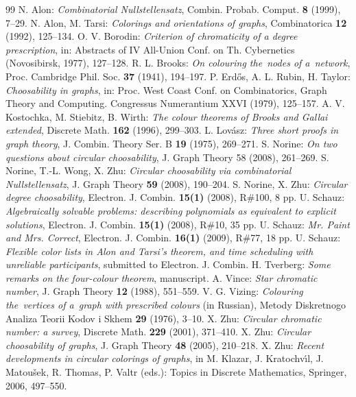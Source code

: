 \documentclass[10pt]{article}
\begin{document}
\begin{thebibliography}{99}
N. Alon:
{\em Combinatorial Nullstellensatz},
Combin. Probab. Comput. {\bf 8} (1999), 7--29.
N. Alon, M. Tarsi:
{\em Colorings and orientations of graphs},
Combinatorica {\bf 12} (1992), 125--134.
O. V. Borodin:
{\em Criterion of chromaticity of a degree prescription},
in: Abstracts of IV All-Union Conf. on Th. Cybernetics (Novosibirsk, 1977), 127--128.
R. L. Brooks:
{\em On colouring the~nodes of a~network},
Proc. Cambridge Phil. Soc. {\bf 37} (1941), 194--197.
P. Erd{\H o}s, A. L. Rubin, H. Taylor:
{\em Choosability in graphs},
in: Proc. West Coast Conf. on Combinatorics, Graph Theory and Computing.
Congressus Numerantium XXVI (1979), 125--157.
A. V. Kostochka, M. Stiebitz, B. Wirth:
{\em The colour theorems of Brooks and Gallai extended},
Discrete Math. {\bf 162} (1996), 299--303.
L. Lov{\'a}sz:
{\em Three short proofs in graph theory},
J. Combin. Theory Ser. B {\bf 19} (1975), 269--271.
S. Norine:
{\em On two questions about circular choosability},
J. Graph Theory 58 (2008), 261--269.
S. Norine, T.-L. Wong, X. Zhu:
{\em Circular choosability via combinatorial Nullstellensatz},
J. Graph Theory {\bf 59} (2008), 190--204.
S. Norine, X. Zhu:
{\em Circular degree choosability},
Electron. J. Combin. {\bf 15(1)} (2008), R\#100, 8 pp.
U. Schauz:
{\em Algebraically solvable problems:
describing polynomials as equivalent to explicit solutions},
Electron. J. Combin. {\bf 15(1)} (2008), R\#10, 35 pp.
U. Schauz:
{\em Mr. Paint and Mrs. Correct},
Electron. J. Combin. {\bf 16(1)} (2009), R\#77, 18 pp.
U. Schauz:
{\em Flexible color lists in Alon and Tarsi's theorem, and time scheduling with unreliable participants},
submitted to Electron. J. Combin.
H. Tverberg:
{\em Some remarks on the four-colour theorem},
manuscript.
A. Vince:
{\em Star chromatic number},
J. Graph Theory {\bf 12} (1988), 551--559.
V. G. Vizing:
{\em Colouring the~vertices of a~graph with prescribed colours} (in Russian), Metody Diskretnogo Analiza Teorii Kodov i Skhem {\bf 29} (1976), 3--10.
X. Zhu:
{\em Circular chromatic number: a survey},
Discrete Math. {\bf 229} (2001), 371--410.
X. Zhu:
{\em Circular choosability of graphs},
J. Graph Theory {\bf 48} (2005), 210--218.
X. Zhu:
{\em Recent developments in circular colorings of graphs},
in M. Klazar, J. Kratochv{\'\i}l, J. Matou{\v s}ek, R. Thomas, P. Valtr (eds.): Topics in Discrete Mathematics, Springer, 2006, 497--550.
\end{thebibliography}
\end{document}
